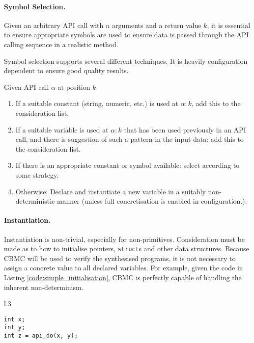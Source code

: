 \documentclass[EPiC]{easychair}
\begin{document}
\paragraph{Symbol Selection.}
Given an arbitrary API call with $n$ arguments and a return value $k$, it is essential to ensure appropriate symbols are used to ensure data is passed through the API calling sequence in a realistic method.

Symbol selection supports several different techniques. It is heavily configuration dependent to ensure good quality results.

Given API call $\alpha$ at position $k$

\begin{enumerate}[label=(\alph*)]
	\item If a suitable constant (string, numeric, etc.) is used at $\alpha:k$, add this to the consideration list.
	\item If a suitable variable is used at $\alpha:k$ that has been used previously in an API call, and there is suggestion of such a pattern in the input data: add this to the consideration list.
	\item If there is an appropriate constant or symbol available: select according to some strategy.
	\item Otherwise: Declare and instantiate a new variable in a suitably non-deterministic manner (unless full concretisation is enabled in configuration.).
\end{enumerate}

\paragraph{Instantiation.}
Instantiation is non-trivial, especially for non-primitives.  Consideration must be made as to how to initialise pointers, \texttt{struct}s and other data structures.  Because CBMC will be used to verify the synthesised programs, it is not necessary to assign a concrete value to all declared variables.  For example, given the code in Listing \ref{code:simple_initialisation}, CBMC is perfectly capable of handling the inherent non-determinism.  


\begin{wrapfigure}[7]{l}{.3\textwidth}
\begin{lstlisting}[caption={A simple, valid calling sequence}, numbers=none, label={code:simple_initialisation}]
int x;
int y;
int z = api_do(x, y);
\end{lstlisting}
\end{wrapfigure}
\end{document}
